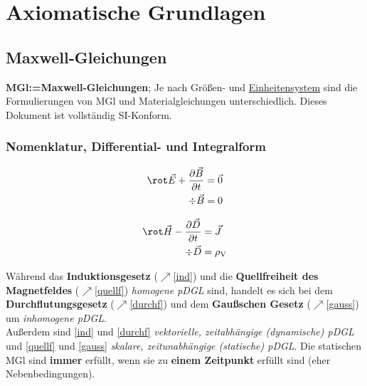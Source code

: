 \chapter{Axiomatische Grundlagen}
 \section{Maxwell-Gleichungen}
 \textbf{MGl:=Maxwell-Gleichungen}; Je nach Größen- und \href{https://de.wikipedia.org/wiki/Einheitensystem}{Einheitensystem} sind die Formulierungen von MGl und Materialgleichungen unterschiedlich. Dieses Dokument ist vollständig SI-Konform.
 \subsection{Nomenklatur, Differential- und Integralform}
  \begin{minipage}{0.5\textwidth}
	  \begin{align}
		  \rot\vec{E}+ \frac{\partial \vec{B}}{\partial t} & = \vec{0}\label{ind} \\
		  \div\vec{B}                                      & =0\label{quellf}
	  \end{align}
  \end{minipage}
  \begin{minipage}{0.5\textwidth}
	  \begin{align}
		  \rot\vec{H}-\frac{\partial\vec{D}}{\partial t} & =\vec{J}\label{durchf}        \\
		  \div\vec{D}                                    & =\rho_{\text{V}}\label{gauss}
	  \end{align}
  \end{minipage}
  Während das \textbf{Induktionsgesetz} ($\nearrow$\ref{ind}) und die \textbf{Quellfreiheit
	  des Magnetfeldes} ($\nearrow$\ref{quellf}) \textit{homogene pDGL} sind,
  handelt es sich bei dem \textbf{Durchflutungsgesetz} ($\nearrow$\ref{durchf})
  und dem \textbf{Gaußschen Gesetz} ($\nearrow$\ref{gauss}) um \textit{inhomogene
	  pDGL}. \\Außerdem sind \ref{ind} und \ref{durchf} \textit{vektorielle, zeitabhängige
	  (dynamische) pDGL} und \ref{quellf} und \ref{gauss} \textit{skalare, zeitunabhängige
	  (statische) pDGL}. Die statischen MGl sind \textbf{immer} erfüllt, wenn sie zu \textbf{einem Zeitpunkt} erfüllt sind (eher Nebenbedingungen). \\
